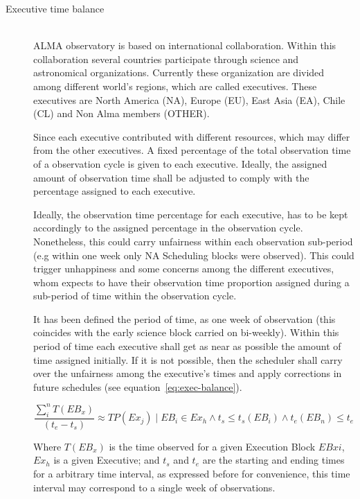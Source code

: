 \begin{description}

\item[Executive time balance] \hfil \\
ALMA observatory is based on international collaboration. Within this collaboration several countries participate through science and astronomical organizations. Currently these organization are divided among different world's regions, which are called executives. These executives are North America (NA), Europe (EU), East Asia (EA), Chile (CL) and Non Alma members (OTHER).

Since each executive contributed with different resources, which may differ from the other executives. A fixed percentage of the total observation time of a observation cycle is given to each executive. Ideally, the assigned amount of observation time shall be adjusted to comply with the percentage assigned to each executive.

Ideally, the observation time percentage for each executive, has to be kept accordingly to the assigned percentage in the observation cycle. Nonetheless, this could carry unfairness within each observation sub-period (e.g within one week only NA Scheduling blocks were observed). This could trigger unhappiness and some concerns among the different executives, whom expects to have their observation time proportion assigned during a sub-period of time within the observation cycle.

It has been defined the period of time, as one week of observation (this coincides with the early science block carried on bi-weekly). Within this period of time each executive shall get as near as possible the amount of time assigned initially. If it is not possible, then the scheduler shall carry over the unfairness among the executive's times and apply corrections in future schedules (see equation~\ref{eq:exec-balance}).

\begin{equation}
\label{eq:exec-balance}
\frac{\sum_{i}^{n} T(EB_x)}{(t_e - t_s)} \approx TP(Ex_j) \mid  EB_i \in Ex_h \land t_s \leq t_s(EB_i) \land t_e(EB_n) \leq t_e
\end{equation}

Where $T(EB_x)$ is the time observed for a given Execution Block $EBxi$, $Ex_h$ is a given Executive; and $t_s$ and $t_e$ are the starting and ending times for a arbitrary time interval, as expressed before for convenience, this time interval may correspond to a single week of observations.


\end{description}
